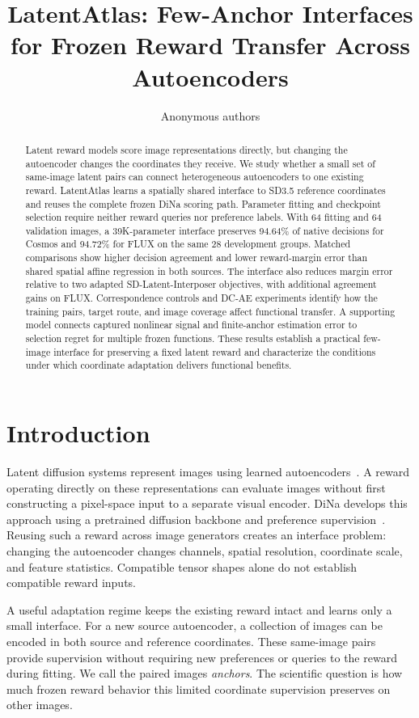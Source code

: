 \documentclass[10pt,twocolumn,letterpaper]{article}
\title{LatentAtlas: Few-Anchor Interfaces for Frozen Reward Transfer Across Autoencoders}
\author{Anonymous authors}
\begin{document}
\maketitle
\begin{abstract}
Latent reward models score image representations directly, but changing the autoencoder changes the coordinates they receive. We study whether a small set of same-image latent pairs can connect heterogeneous autoencoders to one existing reward. LatentAtlas learns a spatially shared interface to SD3.5 reference coordinates and reuses the complete frozen DiNa scoring path. Parameter fitting and checkpoint selection require neither reward queries nor preference labels. With 64 fitting and 64 validation images, a 39K-parameter interface preserves 94.64\% of native decisions for Cosmos and 94.72\% for FLUX on the same 28 development groups. Matched comparisons show higher decision agreement and lower reward-margin error than shared spatial affine regression in both sources. The interface also reduces margin error relative to two adapted SD-Latent-Interposer objectives, with additional agreement gains on FLUX. Correspondence controls and DC-AE experiments identify how the training pairs, target route, and image coverage affect functional transfer. A supporting model connects captured nonlinear signal and finite-anchor estimation error to selection regret for multiple frozen functions. These results establish a practical few-image interface for preserving a fixed latent reward and characterize the conditions under which coordinate adaptation delivers functional benefits.
\end{abstract}

\section{Introduction}
Latent diffusion systems represent images using learned autoencoders~\cite{rombach2022latent}. A reward operating directly on these representations can evaluate images without first constructing a pixel-space input to a separate visual encoder. DiNa develops this approach using a pretrained diffusion backbone and preference supervision~\cite{liu2026beyond}. Reusing such a reward across image generators creates an interface problem: changing the autoencoder changes channels, spatial resolution, coordinate scale, and feature statistics. Compatible tensor shapes alone do not establish compatible reward inputs.

A useful adaptation regime keeps the existing reward intact and learns only a small interface. For a new source autoencoder, a collection of images can be encoded in both source and reference coordinates. These same-image pairs provide supervision without requiring new preferences or queries to the reward during fitting. We call the paired images \emph{anchors}. The scientific question is how much frozen reward behavior this limited coordinate supervision preserves on other images.
\end{document}
